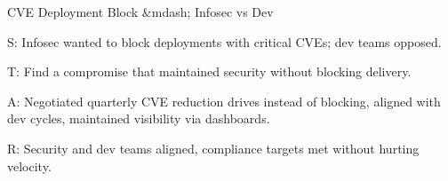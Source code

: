 \documentclass[11pt]{article}
\begin{document}
\begin{starstory}{CVE Deployment Block \&mdash; Infosec vs Dev}
\begin{starlist}
\item[S:] Infosec wanted to block deployments with critical CVEs; dev teams opposed.
\item[T:] Find a compromise that maintained security without blocking delivery.
\item[A:] Negotiated quarterly CVE reduction drives instead of blocking, aligned with dev cycles, maintained visibility via dashboards.
\item[R:] Security and dev teams aligned, compliance targets met without hurting velocity.
\end{starlist}
\end{starstory}
\end{document}
